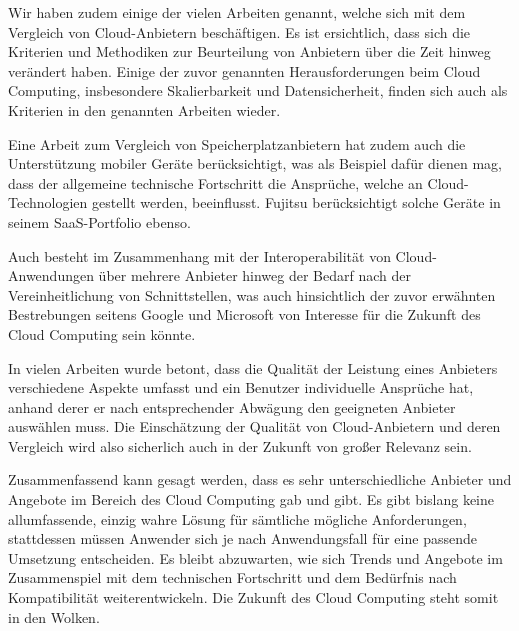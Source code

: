
Wir haben zudem einige der vielen Arbeiten genannt, welche sich mit dem Vergleich von Cloud-Anbietern beschäftigen. 
Es ist ersichtlich, dass sich die Kriterien und Methodiken zur Beurteilung von Anbietern über die Zeit hinweg verändert haben. 
Einige der zuvor genannten Herausforderungen beim Cloud Computing, insbesondere Skalierbarkeit und Datensicherheit, finden sich auch als Kriterien in den genannten Arbeiten wieder. 

Eine Arbeit zum Vergleich von Speicherplatzanbietern hat zudem auch die Unterstützung mobiler Geräte berücksichtigt, was als Beispiel dafür dienen mag, dass der allgemeine technische Fortschritt die Ansprüche, welche an Cloud-Technologien gestellt werden, beeinflusst. 
Fujitsu berücksichtigt solche Geräte in seinem SaaS-Portfolio ebenso.

Auch besteht im Zusammenhang mit der Interoperabilität von Cloud-Anwendungen über mehrere Anbieter hinweg der Bedarf nach der Vereinheitlichung von Schnittstellen, was auch hinsichtlich der zuvor erwähnten Bestrebungen seitens Google und Microsoft von Interesse für die Zukunft des Cloud Computing sein könnte.

In vielen Arbeiten wurde betont, dass die Qualität der Leistung eines Anbieters verschiedene Aspekte umfasst und ein Benutzer individuelle Ansprüche hat, anhand derer er nach entsprechender Abwägung den geeigneten Anbieter auswählen muss. 
Die Einschätzung der Qualität von Cloud-Anbietern und deren Vergleich wird also  sicherlich auch in der Zukunft von großer Relevanz sein. 


Zusammenfassend kann gesagt werden, dass es sehr unterschiedliche Anbieter und Angebote im Bereich des Cloud Computing gab und gibt. 
Es gibt bislang keine allumfassende, einzig wahre Lösung für sämtliche mögliche Anforderungen, stattdessen müssen Anwender sich je nach Anwendungsfall für eine passende Umsetzung entscheiden. 
Es bleibt abzuwarten, wie sich Trends und Angebote im Zusammenspiel mit dem technischen Fortschritt und dem Bedürfnis nach Kompatibilität weiterentwickeln. 
Die Zukunft des Cloud Computing steht somit in den Wolken.
